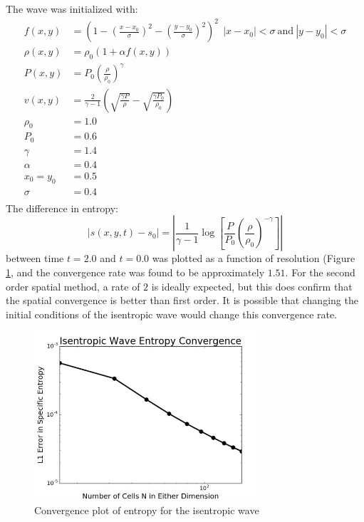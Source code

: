 \documentclass{article}
\begin{document}
The wave was initialized with:
\begin{align*}
    f(x,y) &= \left(1 - \left( \frac{x-x_0}{\sigma}\right)^2 - \left( \frac{y-y_0}{\sigma}\right)^2 \right)^2  \ \ |x-x_0| < \sigma \ \text{and} \ |y-y_0| < \sigma\\
    \rho(x,y) &= \rho_0 (1 + \alpha f(x,y)) \\
    P(x,y) &= P_0 \left( \frac{\rho}{\rho_0} \right)^\gamma \\
    v(x,y) &= \frac{2}{\gamma-1} \left(\sqrt{\frac{\gamma P}{\rho}} - \sqrt{\frac{\gamma P_0}{\rho_0}}\right) \\
    \rho_0 &= 1.0 \\
    P_0 &= 0.6 \\
    \gamma &= 1.4 \\
    \alpha &= 0.4 \\
    x_0 = y_0 &= 0.5 \\
    \sigma &= 0.4 \\
\end{align*}
The difference in entropy: $$|s(x,y,t)-s_0| = \left| \frac{1}{\gamma-1} \log \left[ \frac{P}{P_0} \left(\frac{\rho}{\rho_0} \right)^{-\gamma} \right]\right|$$between time $t=2.0$ and $t=0.0$ was plotted as a function of resolution (Figure \ref{f:conv}, and the convergence rate was found to be approximately $1.51$. For the second order spatial method, a rate of $2$ is ideally expected, but this does confirm that the spatial convergence is better than first order. It is possible that changing the initial conditions of the isentropic wave would change this convergence rate.

 \begin{figure}
     \centering
     \includegraphics[width=0.75\textwidth]{figConv.png}
     \caption{Convergence plot of entropy for the isentropic wave}
     \label{f:conv}
 \end{figure}
 
\end{document}
